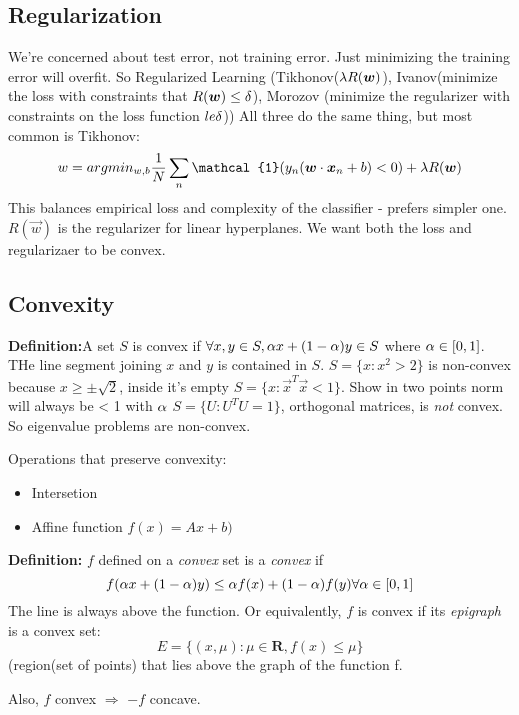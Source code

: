 \subsection{Regularization}
\label{sec:regularization}

We're concerned about test error, not training error. Just minimizing
the training error will overfit. So Regularized Learning
(Tikhonov($\lambda R(\boldsymbol{w})$),
Ivanov(minimize the loss with constraints that $R(\boldsymbol{w}) \le \delta$), Morozov
(minimize the regularizer with constraints on the loss function $le \delta$)) All
three do the same thing, but most common is Tikhonov:
$$w = argmin_{w,b} \frac{1}{N}\sum_n\mathcal{1}(y_n(\vec w\cdot \vec
x_n + b) < 0) + \lam R(\vec w)$$
This balances empirical loss and complexity of the classifier -
prefers simpler one. $R(\vec w)$ is the regularizer for linear hyperplanes.
We want both the loss and regularizaer to be convex.

\subsection{Convexity}
\label{sec:convexity}

\textbf{Definition:}A set $S$ is convex if $\forall x,y\in S, \alpha x + (1-\alpha)y \in S$ where
$\alpha\in [0,1]$. THe line segment joining $x$ and $y$ is contained in
$S$.
$S=\{x:x^2 > 2\}$ is non-convex because $x\ge \pm\sqrt{2}$, inside
it's empty
$S=\{x: \vec x^T \vec x < 1\}$. Show in two points norm will always be
< 1 with $\alpha$
$S=\{U: U^T U = 1\}$, orthogonal matrices, is\emph{ not }convex. So
eigenvalue problems are non-convex.

Operations that preserve convexity:
\begin{itemize}
\item Intersetion
\item Affine function $f(x)=Ax+b)$
\end{itemize}

\textbf{Definition:} $f$ defined on a \emph{convex} set is a
\emph{convex} if 
$$f(\alpha x + (1-\alpha)y) \le \alpha f(x) + (1-\alpha)f(y) \forall \alpha \in
[0,1]$$
The line is always above the function. Or equivalently, $f$ is convex if its \emph{epigraph} is a convex set:
$$E=\{(x,\mu):\mu \in \mathbf{R}, f(x)\le \mu\}$$ (region(set of points) that lies
above the graph of the function f.

Also, $f$ convex $\Rightarrow$ $-f$ concave.

